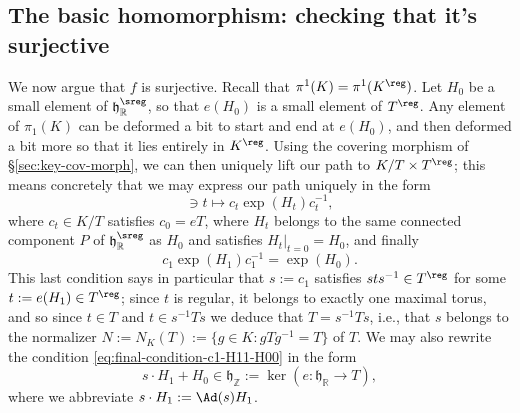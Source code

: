 \documentclass[reqno]{amsart} 
\begin{document}
\subsection{The basic homomorphism: checking that it's surjective}
\label{sec:orgea26b3f}
We now argue that $f$ is surjective.  Recall that $\pi^1(K) = \pi^1(K^{\reg})$.  Let $H_0$ be a small element of $\mathfrak{h}_{\mathbb{R}}^{\sreg}$, so that $e(H_0)$ is a small element of $T^{\reg}$.  Any element of $\pi_1(K)$ can be deformed a bit to start and end at $e(H_0)$, and then deformed a bit more so that it lies entirely in $K^{\reg}$.  Using the covering morphism of \S\ref{sec:key-cov-morph}, we can then uniquely lift our path to $K/T \times T^{\reg}$; this means concretely that we may express our path uniquely in the form
\begin{equation*}
 [0,1]
  \ni t \mapsto c_t \exp(H_t) c_t^{-1},
\end{equation*}
where $c_t \in K/T$ satisfies $c_0 = e T$, where $H_t$ belongs to the same connected component $P$ of $\mathfrak{h}_{\mathbb{R}}^{\sreg}$ as $H_0$ and satisfies $H_t|_{t=0} = H_0$, and finally
\begin{equation}\label{eq:final-condition-c1-H11-H00}
  c_1 \exp(H_1) c_1^{-1} = \exp(H_0).
\end{equation}
This last condition says in particular that $s := c_1$ satisfies $s t s^{-1} \in T^{\reg}$ for some $t := e(H_1) \in T^{\reg}$; since $t$ is regular, it belongs to exactly one maximal torus, and so since $t \in T$ and $t \in s^{-1} T s$ we deduce that $T = s^{-1} T s$, i.e., that $s$ belongs to the normalizer $N := N_K(T) := \{g \in K : g T g^{-1} = T\}$ of $T$.  We may also rewrite the condition \eqref{eq:final-condition-c1-H11-H00} in the form
\begin{equation}\label{eq:integrality-condition-on-s-H11-H00}
  s \cdot H_1 + H_0 \in \mathfrak{h}_\mathbb{Z} := \ker(e : \mathfrak{h}_\mathbb{R} \rightarrow T),
\end{equation}
where we abbreviate $s \cdot H_1 := \Ad(s) H_1$.
\end{document}
